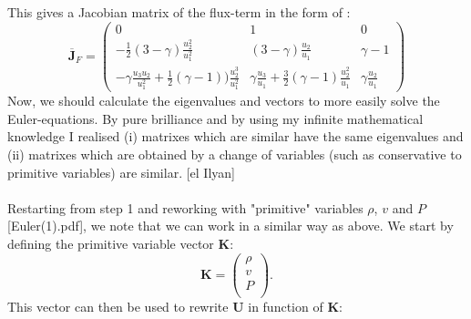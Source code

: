 \documentclass[a4paper]{article}
\begin{document}
This gives a Jacobian matrix of the flux-term in the form of :
\begin{equation}
\overline{\textbf{J}}_F = \left(\begin{matrix}
0 & 1 & 0\\
-\frac{1}{2}(3-\gamma)\frac{u_2^2}{u_1^2} & (3-\gamma)\frac{u_2}{u_1}  & \gamma - 1\\ 
-\gamma \frac{u_3 u_2}{u_1^2} + \frac{1}{2}(\gamma-1))\frac{u_2^3}{u_1^2} & \gamma \frac{u_3 }{u_1} + \frac{3}{2} (\gamma-1)\frac{u_2^2}{u_1} & \gamma \frac{u_2}{u_1}

\end{matrix}\right)
\end{equation}
Now, we should calculate the eigenvalues and vectors to more easily solve the Euler-equations. By pure brilliance and by using my infinite mathematical knowledge I realised (i) matrixes which are similar have the same eigenvalues and (ii) matrixes which are obtained by a change of variables (such as conservative to primitive variables) are similar. [el Ilyan]\\
~\\
Restarting from step 1 and reworking with "primitive" variables $\rho$, $v$ and $P$ [Euler(1).pdf], we note that we can work in a similar way as above. We start by defining the primitive variable vector \textbf{K}: 
\begin{equation}
\mathbf{K} = \left( \begin{array}{c}
\rho \\
v \\
P \\
\end{array}\right) .
\end{equation}
This vector can then be used to rewrite \textbf{U} in function of \textbf{K}:
\end{document}
